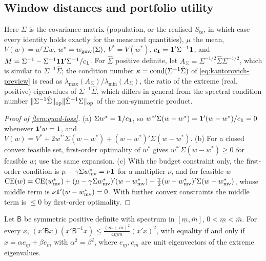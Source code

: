 \subsection{Window distances and portfolio utility}\label{app:proofs-markowitz}

Here $\Sigma$ is the \TEST{} covariance matrix (population, or the realised $S_{\mathrm{te}}$, in
which case every identity holds exactly for the measured quantities), $\mu$ the \TEST{} mean,
$V(w)=w'\Sigma w$, $w^*=w_{\mathrm{gmv}}(\Sigma)$, $V^*=V(w^*)$, $c_{\mathbf{1}}=\mathbf{1}'\Sigma^{-1}\mathbf{1}$, and
$M=\Sigma^{-1}-\Sigma^{-1}\mathbf{1}\mathbf{1}'\Sigma^{-1}/c_{\mathbf{1}}$. For $\hat\Sigma$ positive definite, let
$A_\Sigma=\Sigma^{-1/2}\hat\Sigma\Sigma^{-1/2}$, which is similar to $\Sigma^{-1}\hat\Sigma$; the
condition number $\kappa=\operatorname{cond}(\Sigma^{-1}\hat\Sigma)$ of \eqref{eq:kantorovich-preview} is read as
$\lambda_{\max}(A_\Sigma)/\lambda_{\min}(A_\Sigma)$, the ratio of the extreme (real, positive)
eigenvalues of $\Sigma^{-1}\hat\Sigma$, which differs in general from the spectral condition number
$\lVert\Sigma^{-1}\hat\Sigma\rVert_{\mathrm{op}}\lVert\hat\Sigma^{-1}\Sigma\rVert_{\mathrm{op}}$ of the
non-symmetric product.

\begin{proof}[Proof of \cref{lem:quad-loss}]
(a) $\Sigma w^*=\mathbf{1}/c_{\mathbf{1}}$, so $w^{*\prime}\Sigma(w-w^*)=\mathbf{1}'(w-w^*)/c_{\mathbf{1}}=0$ whenever $\mathbf{1}'w=1$, and
$V(w)=V^*+2w^{*\prime}\Sigma(w-w^*)+(w-w^*)'\Sigma(w-w^*)$.
(b) For a closed convex feasible set, first-order optimality of $w^*$ gives
$w^{*\prime}\Sigma(w-w^*)\ge0$ for feasible $w$; use the same expansion.
(c) With the budget constraint only, the first-order condition is $\mu-\gamma\Sigma w_{\mathrm{mv}}^*=\nu\mathbf{1}$
for a multiplier $\nu$, and for feasible $w$
$\mathrm{CE}(w)=\mathrm{CE}(w_{\mathrm{mv}}^*)+(\mu-\gamma\Sigma w_{\mathrm{mv}}^*)'(w-w_{\mathrm{mv}}^*)-\tfrac\gamma2(w-w_{\mathrm{mv}}^*)'\Sigma(w-w_{\mathrm{mv}}^*)$,
whose middle term is $\nu\mathbf{1}'(w-w_{\mathrm{mv}}^*)=0$. With further convex constraints the middle term is
$\le0$ by first-order optimality.
\end{proof}

\begin{lemma}\label{lem:kantorovich-ineq}
Let $\mathsf B$ be symmetric positive definite with spectrum in $[\underline m,\overline m]$,
$0<\underline m<\overline m$. For every $x$,
$(x'\mathsf Bx)(x'\mathsf B^{-1}x)\le\frac{(\underline m+\overline m)^2}{4\underline m\overline m}(x'x)^2$,
with equality if and only if $x=\alpha e_{\underline m}+\beta e_{\overline m}$ with $\alpha^2=\beta^2$,
where $e_{\underline m},e_{\overline m}$ are unit eigenvectors of the extreme eigenvalues.
\end{lemma}

